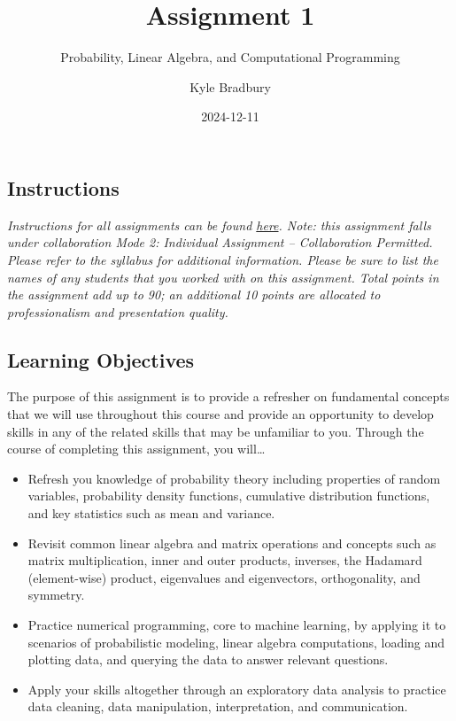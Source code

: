 \documentclass[
  letterpaper,
  DIV=11,
  numbers=noendperiod]{scrartcl}
\title{Assignment 1}
\subtitle{Probability, Linear Algebra, and Computational Programming}
\author{Kyle Bradbury}
\date{2024-12-11}
\providecommand{\tightlist}{%
  \setlength{\itemsep}{0pt}\setlength{\parskip}{0pt}}\usepackage{longtable,booktabs,array}
\renewcommand*\contentsname{Table of contents}
\newcommand\contentsname{Table of contents}
\begin{document}
\maketitle

\renewcommand*\contentsname{Table of contents}
{
\hypersetup{linkcolor=}
\setcounter{tocdepth}{1}
\tableofcontents
}

\subsection{Instructions}\label{instructions}

\emph{Instructions for all assignments can be found
\href{https://kylebradbury.github.io/ids705/notebooks/assignment_instructions.html}{here}.
Note: this assignment falls under collaboration Mode 2: Individual
Assignment -- Collaboration Permitted. Please refer to the syllabus for
additional information. Please be sure to list the names of any students
that you worked with on this assignment. Total points in the assignment
add up to 90; an additional 10 points are allocated to professionalism
and presentation quality.}

\subsection{Learning Objectives}\label{learning-objectives}

The purpose of this assignment is to provide a refresher on fundamental
concepts that we will use throughout this course and provide an
opportunity to develop skills in any of the related skills that may be
unfamiliar to you. Through the course of completing this assignment, you
will\ldots{}

\begin{itemize}
\tightlist
\item
  Refresh you knowledge of probability theory including properties of
  random variables, probability density functions, cumulative
  distribution functions, and key statistics such as mean and variance.
\item
  Revisit common linear algebra and matrix operations and concepts such
  as matrix multiplication, inner and outer products, inverses, the
  Hadamard (element-wise) product, eigenvalues and eigenvectors,
  orthogonality, and symmetry.
\item
  Practice numerical programming, core to machine learning, by applying
  it to scenarios of probabilistic modeling, linear algebra
  computations, loading and plotting data, and querying the data to
  answer relevant questions.
\item
  Apply your skills altogether through an exploratory data analysis to
  practice data cleaning, data manipulation, interpretation, and
  communication.
\end{itemize}
\end{document}
